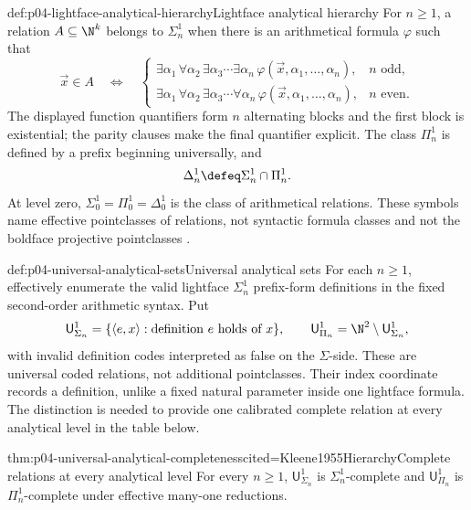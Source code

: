 \begin{hbdefinition}{def:p04-lightface-analytical-hierarchy}{Lightface analytical hierarchy}
For \(n\geq1\), a relation \(A\subseteq\N^k\) belongs to
\(\Sigma^1_n\) when there is an arithmetical formula \(\varphi\) such that
\[
 \vec x\in A\quad\Leftrightarrow\quad
 \begin{cases}
  \exists\alpha_1\,\forall\alpha_2\,\exists\alpha_3\cdots
    \exists\alpha_n\,\varphi(\vec x,\alpha_1,\ldots,\alpha_n),
       & n\text{ odd},\\
  \exists\alpha_1\,\forall\alpha_2\,\exists\alpha_3\cdots
    \forall\alpha_n\,\varphi(\vec x,\alpha_1,\ldots,\alpha_n),
       & n\text{ even}.
 \end{cases}
\]
The displayed function quantifiers form \(n\) alternating blocks and the first
block is existential; the parity clauses make the final quantifier explicit.
The class \(\Pi^1_n\) is defined by a prefix
beginning universally, and
\[
 \Delta^1_n\defeq\Sigma^1_n\cap\Pi^1_n.
\]
At level zero, \(\Sigma^1_0=\Pi^1_0=\Delta^1_0\) is the class of
arithmetical relations.  These symbols name effective pointclasses of
relations, not syntactic formula classes and not the boldface projective
pointclasses \cite{Kleene1955Hierarchy,Moschovakis2016Hyperarithmetical}.
\end{hbdefinition}

\begin{hbdefinition}{def:p04-universal-analytical-sets}{Universal analytical sets}
For each \(n\geq1\), effectively enumerate the valid lightface
\(\Sigma^1_n\) prefix-form definitions in the fixed second-order arithmetic
syntax.  Put
\[
 \mathsf U^1_{\Sigma_n}
 =\{\langle e,x\rangle:\text{definition }e\text{ holds of }x\},
 \qquad
 \mathsf U^1_{\Pi_n}=\N^2\setminus\mathsf U^1_{\Sigma_n},
\]
with invalid definition codes interpreted as false on the \(\Sigma\)-side.
These are universal coded relations, not additional pointclasses.  Their index
coordinate records a definition, unlike a fixed natural parameter inside one
lightface formula.  The distinction is needed to provide one calibrated
complete relation at every analytical level in the table below.
\end{hbdefinition}

\begin{hbtheorem}{thm:p04-universal-analytical-completeness}{cited=Kleene1955Hierarchy}{Complete relations at every analytical level}
For every \(n\geq1\), \(\mathsf U^1_{\Sigma_n}\) is
\(\Sigma^1_n\)-complete and \(\mathsf U^1_{\Pi_n}\) is
\(\Pi^1_n\)-complete under effective many-one reductions.
\end{hbtheorem}

